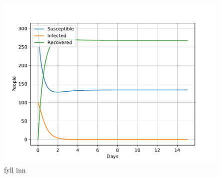 \documentclass[a4paper]{article}
\begin{document}
\begin{figure}[!htb]
	\includegraphics[scale=0.56]{../plots/opp_e_D0.pdf}
	\caption{fyll inn}
	\label{opp_e0}
\end{figure}
\end{document}
